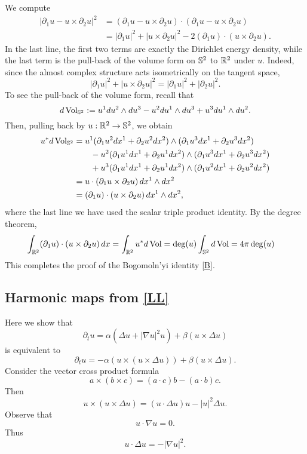 We compute
    \begin{align*}
        |\partial_1 u - u \times \partial_2 u |^2 
            &= (\partial_1 u - u \times \partial_2 u) \cdot (\partial_1 u - u \times \partial_2 u)\\
            &= |\partial_1 u|^2 + |u \times \partial_2 u|^2 - 2 (\partial_1 u) \cdot (u \times \partial_2 u) .
    \end{align*}
In the last line, the first two terms are exactly the Dirichlet energy density, while the last term is the pull-back of the volume form on $\mathbb S^2$ to $\mathbb R^2$ under $u$. Indeed, since the almost complex structure acts isometrically on the tangent space,    
    \[
        |\partial_1 u|^2 + |u \times \partial_2 u|^2 = |\partial_1 u|^2 + |\partial_2 u|^2. 
    \]
To see the pull-back of the volume form, recall that 
    \[
        d\operatorname{Vol}_{\mathbb S^2}
            := u^1 du^2 \wedge du^3 - u^2 du^1 \wedge du^3 + u^3 du^1 \wedge du^2.
    \]
Then, pulling back by $u : \mathbb R^2 \to \mathbb S^2$, we obtain 
    \begin{align*}
        u^* d \operatorname{Vol}_{\mathbb S^2}
            &= u^1 (\partial_1 u^2 dx^1 + \partial_2 u^2 dx^2) \wedge  (\partial_1 u^3 dx^1 + \partial_2 u^3 dx^2) \\
            &\qquad - u^2 (\partial_1 u^1 dx^1 + \partial_2 u^1 dx^2)  \wedge (\partial_1 u^3 dx^1 + \partial_2 u^3 dx^2)  \\
            &\qquad + u^3 (\partial_1 u^1 dx^1 + \partial_2 u^1 dx^2)  \wedge  (\partial_1 u^2 dx^1 + \partial_2 u^2 dx^2) \\
            &= u \cdot (\partial_1 u \times \partial_2 u) \, dx^1 \wedge dx^2\\
            &=  (\partial_1 u) \cdot (u \times \partial_2 u) \, dx^1 \wedge dx^2, 
    \end{align*}
where the last line we have used the scalar triple product identity. By the degree theorem, 
    \begin{align*}
        \int_{\mathbb R^2} (\partial_1 u) \cdot (u \times \partial_2 u) \, dx
            &= \int_{\mathbb R^2} u^* d\operatorname{Vol} = \deg(u) \int_{\mathbb S^2} d\operatorname{Vol} = 4\pi  \deg(u)
    \end{align*}
This completes the proof of the Bogomoln'yi identity \eqref{B}. 


\subsection{Harmonic maps from \eqref{LL}}

Here we show that 
    \[
        \partial_t u 
            = \alpha( \Delta u + |\nabla u|^2 u) + \beta (u \times \Delta u)
    \]
is equivalent to 
    \[
        \partial_t u 
            = -\alpha (u \times (u \times \Delta u)) + \beta (u \times \Delta u ).
    \]
Consider the vector cross product formula 
    \[
        a \times (b \times c) = (a \cdot c) b - (a \cdot b) c. 
    \]
Then 
    \[
        u \times (u \times \Delta u) = (u \cdot \Delta u) u - |u|^2 \Delta u. 
    \]
Observe that 
    \[
        u \cdot \nabla u = 0. 
    \]
Thus 
    \[
        u \cdot \Delta u = - |\nabla u|^2. 
    \]